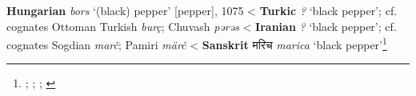 \begin{etymology}\label{ety:bors}
\textbf{Hungarian} \textit{bors} `(black) pepper' [pepper], 1075
< \textbf{Turkic} \textit{?} `black pepper'; cf. cognates Ottoman Turkish \textit{burç}; Chuvash \textit{pərəs}
< \textbf{Iranian} \textit{?} `black pepper'; cf. cognates Sogdian \textit{marč}; Pamiri \textit{märč}
< \textbf{Sanskrit} {मरिच} \textit{marica} `black pepper'\footnote{\textcite{zaicz_etimologiai_2006}; \textcite{zaicz_etimologiai_2006}; \textcite{zaicz_etimologiai_2006}; \textcite[790]{monier-williams_sanskrit-english_1899}}
\end{etymology}